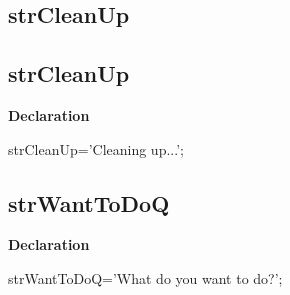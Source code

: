 \documentclass{report}
\newif\ifpdf
\begin{document}
\subsection*{\large{\textbf{strCleanUp}}\normalsize\hspace{1ex}\hrulefill}
\else
\subsection*{strCleanUp}
\fi
\label{trstrings-strCleanUp}
\begin{list}{}{
\setlength{\itemindent}{0cm}
\setlength{\listparindent}{0cm}
\setlength{\leftmargin}{\evensidemargin}
\addtolength{\leftmargin}{\tmplength}
\settowidth{\labelsep}{X}
\addtolength{\leftmargin}{\labelsep}
\setlength{\labelwidth}{\tmplength}
}
\item[\textbf{Declaration}\hfill]
\ifpdf
\begin{flushleft}
\fi
\begin{ttfamily}
strCleanUp='Cleaning up...';\end{ttfamily}

\ifpdf
\end{flushleft}
\fi

\end{list}
\ifpdf
\subsection*{\large{\textbf{strWantToDoQ}}\normalsize\hspace{1ex}\hrulefill}
\else
\subsection*{strWantToDoQ}
\fi
\label{trstrings-strWantToDoQ}
\begin{list}{}{
\setlength{\itemindent}{0cm}
\setlength{\listparindent}{0cm}
\setlength{\leftmargin}{\evensidemargin}
\addtolength{\leftmargin}{\tmplength}
\settowidth{\labelsep}{X}
\addtolength{\leftmargin}{\labelsep}
\setlength{\labelwidth}{\tmplength}
}
\item[\textbf{Declaration}\hfill]
\ifpdf
\begin{flushleft}
\fi
\begin{ttfamily}
strWantToDoQ='What do you want to do?';\end{ttfamily}

\ifpdf
\end{flushleft}
\fi

\end{list}
\ifpdf
\end{document}
